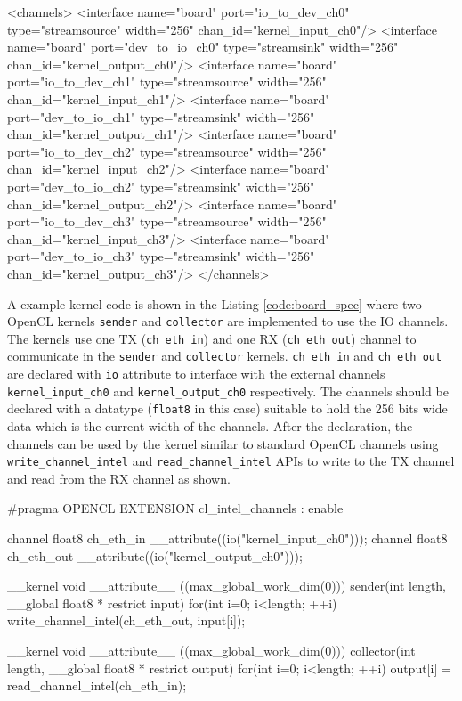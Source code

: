 \begin{XmlCode}[caption=IO channels description in \texttt{board\_spec.xml}, frame=tlrb, label=code:board_spec]
<channels>
    <interface name="board" port="io_to_dev_ch0" type="streamsource" width="256" chan_id="kernel_input_ch0"/>
    <interface name="board" port="dev_to_io_ch0" type="streamsink" width="256" chan_id="kernel_output_ch0"/>
    <interface name="board" port="io_to_dev_ch1" type="streamsource" width="256" chan_id="kernel_input_ch1"/>
    <interface name="board" port="dev_to_io_ch1" type="streamsink" width="256" chan_id="kernel_output_ch1"/>
    <interface name="board" port="io_to_dev_ch2" type="streamsource" width="256" chan_id="kernel_input_ch2"/>
    <interface name="board" port="dev_to_io_ch2" type="streamsink" width="256" chan_id="kernel_output_ch2"/>
    <interface name="board" port="io_to_dev_ch3" type="streamsource" width="256" chan_id="kernel_input_ch3"/>
    <interface name="board" port="dev_to_io_ch3" type="streamsink" width="256" chan_id="kernel_output_ch3"/>
</channels>
\end{XmlCode}

A example kernel code is shown in the Listing \ref{code:board_spec} where two OpenCL
kernels \texttt{sender} and \texttt{collector}
are implemented to use the IO channels. The kernels use one TX (\texttt{ch\_eth\_in})
and one RX (\texttt{ch\_eth\_out}) channel to
communicate in the \texttt{sender} and \texttt{collector} kernels.
\texttt{ch\_eth\_in} and \texttt{ch\_eth\_out} are declared with \texttt{io} attribute
to interface with the external channels \texttt{kernel\_input\_ch0} and \texttt{kernel\_output\_ch0} respectively.
The channels should be declared with a datatype (\texttt{float8} in this case)
suitable to hold the 256 bits wide data which is the current width of the channels.
After the declaration, the channels can be used by the kernel similar to standard OpenCL
channels using \texttt{write\_channel\_intel} and \texttt{read\_channel\_intel} APIs to write
to the TX channel and read from the RX channel as shown.

\begin{CppCode}[caption=IO channels usage example in a OpenCL kernel, frame=tlrb, label=code:board_spec, float]
#pragma OPENCL EXTENSION cl_intel_channels : enable

channel float8 ch_eth_in __attribute((io("kernel_input_ch0")));
channel float8 ch_eth_out __attribute((io("kernel_output_ch0")));

__kernel void __attribute__ ((max_global_work_dim(0)))
sender(int length, __global float8 * restrict input)
{
    for(int i=0; i<length; ++i)
        write_channel_intel(ch_eth_out, input[i]);
}

__kernel void __attribute__ ((max_global_work_dim(0)))
collector(int length, __global float8 * restrict output)
{
    for(int i=0; i<length; ++i)
        output[i] = read_channel_intel(ch_eth_in);
}
\end{CppCode}

